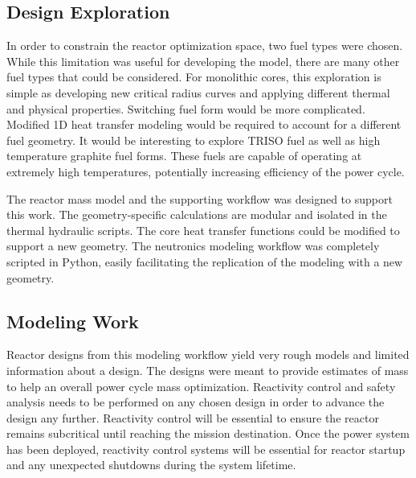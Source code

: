\subsection{Design Exploration}
In order to constrain the reactor optimization space, two fuel types were
chosen. While this limitation was useful for developing the model, 
there are many other fuel types that could be considered. For monolithic
cores, this exploration is simple as developing new critical radius curves and
applying different thermal and physical properties. Switching fuel form would be
more complicated. Modified 1D heat transfer modeling would be required to
account for a different fuel geometry. It would be interesting to explore
TRISO fuel as well as high temperature graphite fuel forms. These fuels are
capable of operating at extremely high temperatures, potentially increasing
efficiency of the power cycle.

The reactor mass model and the supporting workflow was designed to support this
work. The geometry-specific calculations are modular and isolated in the thermal
hydraulic scripts. The core heat transfer functions could be modified to support
a new geometry. The neutronics modeling workflow was completely scripted in
Python, easily facilitating the replication of the modeling with a new geometry.

\subsection{Modeling Work}
Reactor designs from this modeling workflow yield very rough models and limited
information about a design. The designs were meant to provide estimates of mass
to help an overall power cycle mass optimization. Reactivity control and safety
analysis needs to be performed on any chosen design in order to advance the
design any further. Reactivity control will be essential to ensure the reactor
remains subcritical until reaching the mission destination. Once the power
system has been deployed, reactivity control systems will be essential for
reactor startup and any unexpected shutdowns during the system lifetime.
